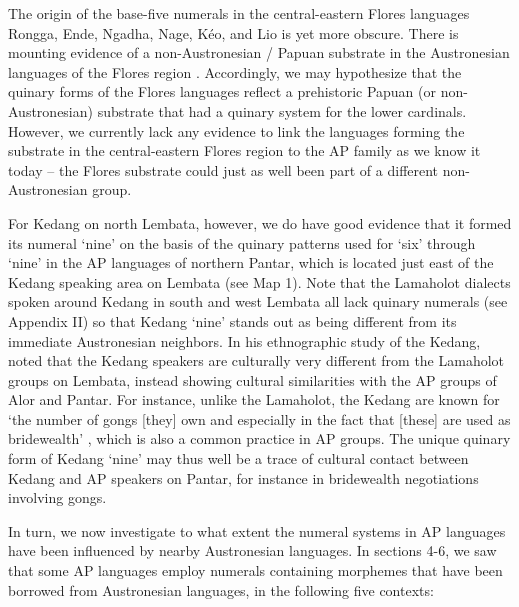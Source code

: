 \documentclass[output=paper]{LSP/langsci}
\begin{document}
The origin of the base-five numerals in the central-eastern Flores languages Rongga, Ende, Ngadha, Nage, K\'eo, and Lio is yet more obscure. There is mounting evidence of a non-Austronesian / Papuan substrate in the Austronesian languages of the Flores region \citep[see, e.g.,][]{Capell1976,Klamer2012}. Accordingly, we may hypothesize that the quinary forms of the Flores languages reflect a prehistoric Papuan (or non-Austronesian) substrate that had a quinary system for the lower cardinals. However, we currently lack any evidence to link the languages forming the substrate in the central-eastern Flores region to the AP family as we know it today -- the Flores substrate could just as well been part of a different non-Austronesian group. 

For Kedang on north Lembata, however, we do have good evidence that it formed its numeral `nine' on the basis of the quinary patterns used for `six' through `nine' in the AP languages of northern Pantar, which is located just east of the Kedang speaking area on Lembata (see Map 1). Note that the Lamaholot dialects spoken around Kedang in south and west Lembata all lack quinary numerals (see Appendix II) so that Kedang `nine' stands out as being different from its immediate Austronesian neighbors. In his ethnographic study of the Kedang, \citet{Barnes1974} noted that the Kedang speakers are culturally very different from the Lamaholot groups on Lembata, instead showing cultural similarities with the AP groups of Alor and Pantar. For instance, unlike the Lamaholot, the Kedang are known for `the number of gongs [they] own and especially in the fact that [these] are used as bridewealth' \citep[15]{Barnes1974}, which is also a common practice in AP groups. The unique quinary form of Kedang `nine' may thus well be a trace of cultural contact between Kedang and AP speakers on Pantar, for instance in bridewealth negotiations involving gongs.{} 

In turn, we now investigate to what extent the numeral systems in AP languages have been influenced by nearby Austronesian languages. In sections 4-6, we saw that some AP languages employ numerals containing morphemes that have been borrowed from Austronesian languages, in the following five contexts: 
\end{document}
